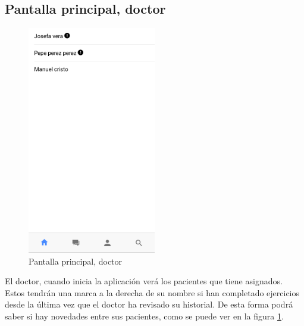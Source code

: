\subsection{Pantalla principal, doctor}
\begin{figure}[!h]
    \centering
    \includegraphics[width=0.5\textwidth]{images/screenshots/doctor-home.png}
    \caption{Pantalla principal, doctor}
    \label{doctor-home}
\end{figure}

El doctor, cuando inicia la aplicación verá los pacientes que tiene asignados.
Estos tendrán una marca a la derecha de su nombre si han completado ejercicios
desde la última vez que el doctor ha revisado su historial. De esta forma podrá
saber si hay novedades entre sus pacientes, como se puede ver en la figura \ref{doctor-home}.
\clearpage

